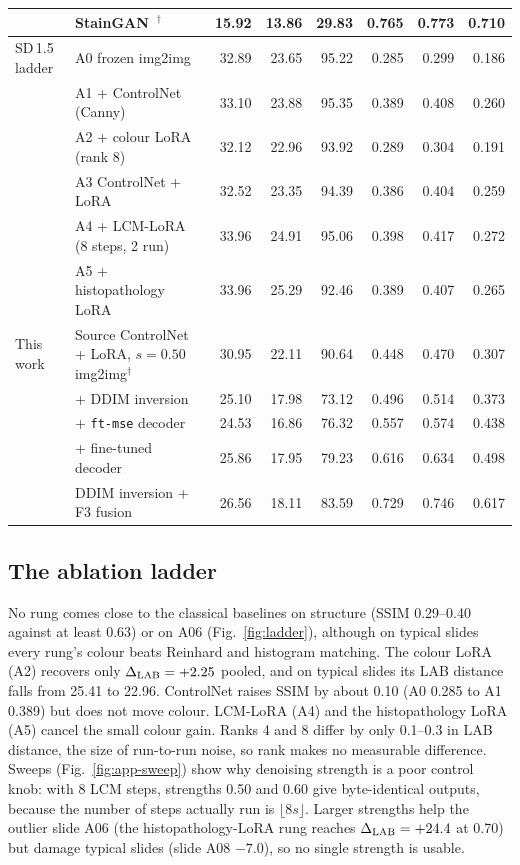 \begin{table}[t]
\begin{tabular}{llrrrrrr}
 & StainGAN~\cite{shaban2019staingan}$^\dagger$ & \textbf{15.92} & 13.86 & 29.83 & \textbf{0.765} & \textbf{0.773} & \textbf{0.710}\\
\midrule
SD\,1.5 ladder & A0 frozen img2img & 32.89 & 23.65 & 95.22 & 0.285 & 0.299 & 0.186\\
 & A1 + ControlNet (Canny) & 33.10 & 23.88 & 95.35 & 0.389 & 0.408 & 0.260\\
 & A2 + colour LoRA (rank 8) & 32.12 & 22.96 & 93.92 & 0.289 & 0.304 & 0.191\\
 & A3 ControlNet + LoRA & 32.52 & 23.35 & 94.39 & 0.386 & 0.404 & 0.259\\
 & A4 + LCM-LoRA (8 steps, 2 run) & 33.96 & 24.91 & 95.06 & 0.398 & 0.417 & 0.272\\
 & A5 + histopathology LoRA & 33.96 & 25.29 & 92.46 & 0.389 & 0.407 & 0.265\\
\midrule
This work & Source ControlNet + LoRA, $s=0.50$ img2img$^\dagger$ & 30.95 & 22.11 & 90.64 & 0.448 & 0.470 & 0.307\\
 & + DDIM inversion & 25.10 & 17.98 & 73.12 & 0.496 & 0.514 & 0.373\\
 & + \texttt{ft-mse} decoder & 24.53 & 16.86 & 76.32 & 0.557 & 0.574 & 0.438\\
 & + fine-tuned decoder & 25.86 & 17.95 & 79.23 & 0.616 & 0.634 & 0.498\\
 & DDIM inversion + F3 fusion & 26.56 & 18.11 & 83.59 & 0.729 & 0.746 & 0.617\\
\bottomrule
\end{tabular}
\end{table}

\subsection{The ablation ladder}
No rung comes close to the classical baselines on structure (SSIM 0.29--0.40 against at least 0.63) or on
A06 (Fig.~\ref{fig:ladder}), although on typical slides every rung's colour beats Reinhard and histogram matching. The colour LoRA (A2) recovers only
$\Delta_{\mathrm{LAB}}=+2.25$ pooled, and on typical slides its LAB distance falls from 25.41 to 22.96. ControlNet raises
SSIM by about 0.10 (A0 0.285 to A1 0.389) but does not move colour. LCM-LoRA (A4) and the histopathology
LoRA (A5) cancel the small colour gain. Ranks 4 and 8 differ by only 0.1--0.3 in LAB distance, the size of run-to-run noise, so rank makes no measurable difference.
Sweeps (Fig.~\ref{fig:app-sweep}) show why denoising strength is a poor control knob: with 8 LCM steps, strengths 0.50 and 0.60 give
byte-identical outputs, because the number of steps actually run is $\lfloor 8s\rfloor$. Larger strengths
help the outlier slide A06 (the histopathology-LoRA rung reaches $\Delta_{\mathrm{LAB}}=+24.4$ at 0.70) but damage typical slides
(slide A08 $-7.0$), so no
single strength is usable.


